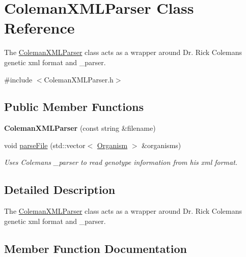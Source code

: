 \hypertarget{class_coleman_x_m_l_parser}{}\section{Coleman\+X\+M\+L\+Parser Class Reference}
\label{class_coleman_x_m_l_parser}


The \hyperlink{class_coleman_x_m_l_parser}{Coleman\+X\+M\+L\+Parser} class acts as a wrapper around Dr. Rick Coleman\textquotesingle{}s genetic xml format and \+\_\+parser.  




{\ttfamily \#include $<$Coleman\+X\+M\+L\+Parser.\+h$>$}

\subsection*{Public Member Functions}
\begin{DoxyCompactItemize}
\item 
{\bfseries Coleman\+X\+M\+L\+Parser} (const string \&filename)\hypertarget{class_coleman_x_m_l_parser_a8eda751b3cb0b3f94add5a24fddacbc1}{}\label{class_coleman_x_m_l_parser_a8eda751b3cb0b3f94add5a24fddacbc1}

\item 
void \hyperlink{class_coleman_x_m_l_parser_ae168a5ae05ee145556a7b1f612fde3ea}{parse\+File} (std\+::vector$<$ \hyperlink{class_organism}{Organism} $>$ \&organisms)
\begin{DoxyCompactList}\small\item\em Uses Coleman\textquotesingle{}s \+\_\+parser to read genotype information from his xml format. \end{DoxyCompactList}\end{DoxyCompactItemize}


\subsection{Detailed Description}
The \hyperlink{class_coleman_x_m_l_parser}{Coleman\+X\+M\+L\+Parser} class acts as a wrapper around Dr. Rick Coleman\textquotesingle{}s genetic xml format and \+\_\+parser. 

\subsection{Member Function Documentation}
